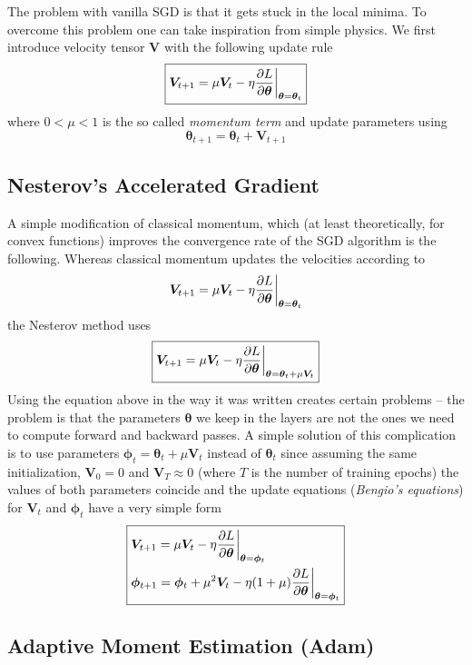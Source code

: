 \documentclass{myclass}
\begin{document}
The problem with vanilla SGD is that it gets stuck in the local minima. To overcome this problem one
can take inspiration from simple physics. We first introduce velocity tensor \(\bm{V}\) with the
following update rule
\[
\boxed
{
   \bm{V}_{t+1} = \mu \bm{V}_{t} - \eta \pdv{L}{\bm{\theta}}\bigg|_{\bm{\theta}=\bm{\theta}_t}
}
\] 
where \(0 < \mu < 1\) is the so called \emph{momentum term} and update parameters using
\[
\boxed
{ 
   \bm{\theta}_{t+1} = \bm{\theta}_t + \bm{V}_{t+1}
}
\]


\subsection{Nesterov's Accelerated Gradient}

A simple modification of classical momentum, which (at least theoretically, for convex functions)
improves the convergence rate of the SGD algorithm is the following. Whereas classical momentum
updates the velocities according to
\[
   \bm{V}_{t+1} = \mu \bm{V}_{t} - \eta \pdv{L}{\bm{\theta}}\bigg|_{\bm{\theta} = \bm{\theta}_t}
\]
the Nesterov method uses
\[
\boxed
{
   \bm{V}_{t+1} = \mu \bm{V}_{t} - \eta \pdv{L}{\bm{\theta}}\bigg|_{\bm{\theta} = \bm{\theta}_t + \mu \bm{V}_t}
}
\]
Using the equation above in the way it was written creates certain problems -- the problem is that
the parameters $\bm{\theta}$ we keep in the layers are not the ones we need to compute forward and
backward passes. A simple solution of this complication is to use parameters $\bm{\phi}_t =
\bm{\theta}_t + \mu \bm{V}_t$ instead of $\bm{\theta}_t$ since assuming the same initialization,
$\bm{V}_0 = 0$ and $\bm{V}_{T} \approx 0$ (where $T$ is the number of training epochs) the values of
both parameters coincide and the update equations (\emph{\mbox{Bengio's} equations}) for $\bm{V}_t$
and $\bm{\phi}_t$ have a very simple form
\[
\boxed
{
\begin{split}
   &\bm{V}_{t+1} = \mu \bm{V}_t - \eta \pdv{L}{\bm{\theta}}\bigg|_{\bm{\theta} = \bm{\phi}_t}\\
   &\bm{\phi}_{t+1} = \bm{\phi}_t + \mu^2 \bm{V}_t - \eta (1 + \mu) \pdv{L}{\bm{\theta}}\bigg|_{\bm{\theta} = \bm{\phi}_t}
\end{split}
}
\]


\subsection{Adaptive Moment Estimation (Adam)}
\end{document}
